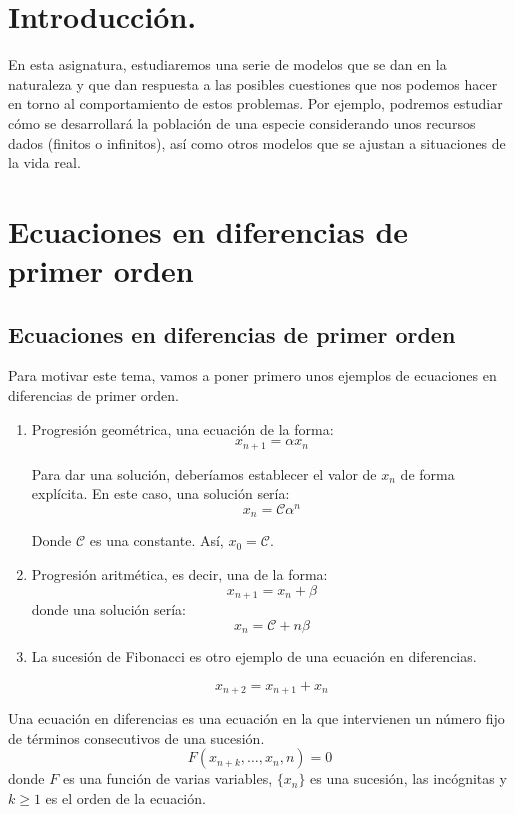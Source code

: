 \section*{Introducción.}
En esta asignatura, estudiaremos una serie de modelos que se dan en la naturaleza y que dan respuesta a las posibles cuestiones que nos podemos hacer en torno al comportamiento de estos problemas. Por ejemplo, podremos estudiar cómo se desarrollará la población de una especie considerando unos recursos dados (finitos o infinitos), así como otros modelos que se ajustan a situaciones de la vida real.



\newpage
\section{Ecuaciones en diferencias de primer orden}
\subsection[E.D. primer orden]{Ecuaciones en diferencias de primer orden}

Para motivar este tema, vamos a poner primero unos ejemplos de ecuaciones en diferencias de primer orden.

\begin{enumerate}
	\item Progresión geométrica, una ecuación de la forma:
\[
x_{n+1} =  \alpha x_n
\]

Para dar una solución, deberíamos establecer el valor de $x_n$ de forma explícita. En este caso, una solución sería:
\[
x_n = \mathcal{C} \alpha^n
\]

Donde $\mathcal{C}$ es una constante. Así, $x_0 = \mathcal{C}$.

\item Progresión aritmética, es decir, una de la forma:
\[
x_{n+1} = x_n + \beta
\]
donde una solución sería:
\[
x_n = \mathcal{C} + n\beta
\]

\item La sucesión de Fibonacci es otro ejemplo de una ecuación en diferencias.

\[
x_{n+2} = x_{n+1} + x_{n}
\]

\end{enumerate}

\begin{ndef}
	Una ecuación en diferencias es una ecuación en la que intervienen un número fijo de términos consecutivos de una sucesión.
	\[
	F(x_{n+k},\dots, x_n , n)= 0
	\]
donde $F$ es una función de varias variables, $\{x_n\}$ es una sucesión, las incógnitas y $k \geq 1 $ es el orden de la ecuación.
\end{ndef}

